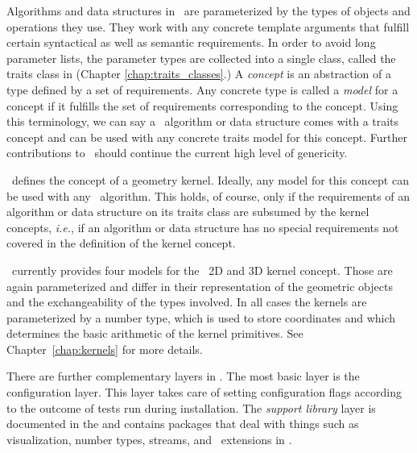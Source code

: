 Algorithms and data structures in \cgal\ are parameterized by the 
types of objects and operations they use. They work with any concrete 
template arguments that fulfill certain syntactical as well as semantic
requirements. In order to avoid long parameter lists,
the parameter types are collected into a single class, called the
traits class in \cgal{}
(Chapter \ref{chap:traits_classes}.)
A {\em concept} is an abstraction of a type 
defined by a set of requirements.
Any concrete type is called a {\em model} for a 
concept if it fulfills
the set of requirements corresponding to the concept. Using this terminology,
we can say a \cgal\ algorithm or data structure comes with a traits 
concept and can be used with any concrete traits model for this concept.
Further contributions to \cgal\ should continue the current high
level of genericity. 

\cgal\ defines the concept of a geometry kernel.%
Ideally, any
model for this concept can be used with any \cgal\ algorithm. This holds, 
of course, only if the requirements of an algorithm or data structure on its
traits class are subsumed by the kernel concepts, {\em i.e.}, if an
algorithm or data structure has no special requirements 
not covered in the definition of the kernel concept. 

\cgal\ currently provides four models for the \cgal\ 2D and 3D kernel
concept. Those are again parameterized and differ in their 
representation of the geometric objects and the exchangeability of
the types involved. 
In all cases the kernels are parameterized by a number type, which
is used to store coordinates and which determines the basic arithmetic
of the kernel primitives.  See Chapter~\ref{chap:kernels} for more details.

There are further complementary layers in \cgal. The most basic layer is 
the configuration layer.
This layer takes care of setting configuration flags according to the outcome
of tests run during installation.  The {\em support library} layer
 is documented in
the  and contains packages
that deal with things such as visualization, number types, streams, and
\stl\ extensions in \cgal.

